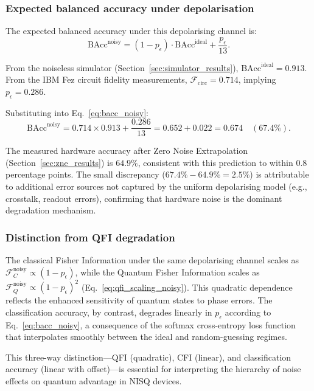 \subsubsection{Expected balanced accuracy under depolarisation}

The expected balanced accuracy under this depolarising channel is:
\begin{equation}
  \label{eq:bacc_noisy}
  \text{BAcc}^\text{noisy} = (1-p_\epsilon) \cdot \text{BAcc}^\text{ideal} + \frac{p_\epsilon}{13}.
\end{equation}

From the noiseless simulator (Section~\ref{sec:simulator_results}), $\text{BAcc}^\text{ideal} = 0.913$.
From the IBM Fez circuit fidelity measurements, $\mathcal{F}_\text{circ} = 0.714$, implying $p_\epsilon = 0.286$.

Substituting into Eq.~\eqref{eq:bacc_noisy}:
\begin{equation}
  \text{BAcc}^\text{noisy} = 0.714 \times 0.913 + \frac{0.286}{13}
  = 0.652 + 0.022
  = 0.674 \quad (67.4\%).
\end{equation}

The measured hardware accuracy after Zero Noise Extrapolation (Section~\ref{sec:zne_results}) is $64.9\%$, 
consistent with this prediction to within $0.8$ percentage points. The small discrepancy ($67.4\% - 64.9\% = 2.5\%$) 
is attributable to additional error sources not captured by the uniform depolarising model (e.g., crosstalk, readout errors), 
confirming that hardware noise is the dominant degradation mechanism.

\subsubsection{Distinction from QFI degradation}

The classical Fisher Information under the same depolarising channel scales as $\mathcal{F}_C^\text{noisy} \propto (1-p_\epsilon)$,
while the Quantum Fisher Information scales as $\mathcal{F}_Q^\text{noisy} \propto (1-p_\epsilon)^2$ (Eq.~\ref{eq:qfi_scaling_noisy}).
This quadratic dependence reflects the enhanced sensitivity of quantum states to phase errors.
The classification accuracy, by contrast, degrades linearly in $p_\epsilon$ according to Eq.~\eqref{eq:bacc_noisy},
a consequence of the softmax cross-entropy loss function that interpolates smoothly between the ideal and random-guessing regimes.

This three-way distinction—QFI (quadratic), CFI (linear), and classification accuracy (linear with offset)—is essential for interpreting
the hierarchy of noise effects on quantum advantage in NISQ devices.

